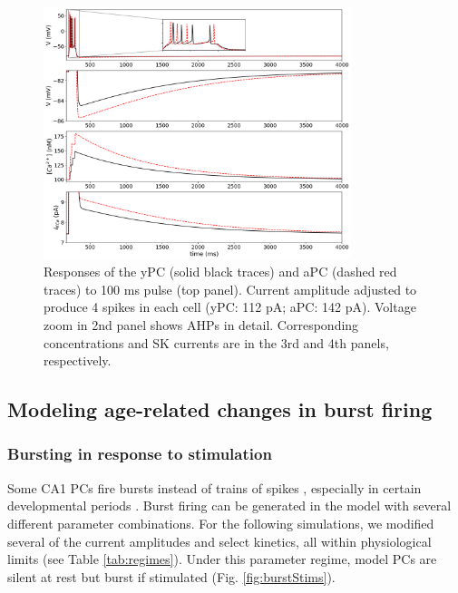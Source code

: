 \documentclass[12pt]{article}
\begin{document}
\begin{figure}[h!]
\centering
\includegraphics[width=0.8\textwidth]{figures/fig2.png}
\caption{Responses of the yPC (solid black traces) and aPC (dashed red traces) to 100 ms pulse (top panel). Current amplitude adjusted to produce 4 spikes in each cell (yPC: 112 pA; aPC: 142 pA). Voltage zoom in 2nd panel shows AHPs in detail. Corresponding {\Ca} concentrations and SK currents are in the 3rd and 4th panels, respectively.}
\label{fig:AHP}
\end{figure}

\subsection{Modeling age-related changes in burst firing}

\smallskip

\subsubsection{Bursting in response to stimulation}

Some CA1 PCs fire bursts instead of trains of spikes \citep{su2001extracellular}, especially in certain developmental periods \citep{chen2005transitional}. Burst firing can be generated in the model with several different parameter combinations. For the following simulations, we modified several of the current amplitudes and select kinetics, all within physiological limits (see Table \ref{tab:regimes}). Under this parameter regime, model PCs are silent at rest but burst if stimulated (Fig. \ref{fig:burstStims}).
\end{document}
